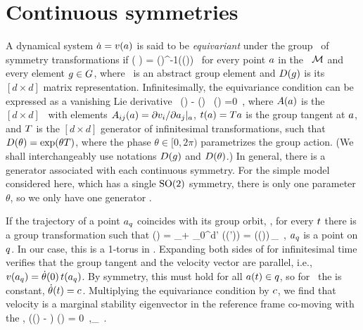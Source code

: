 \section{Continuous symmetries}
\label{s:symm}

A dynamical system $\dot{a}={v}(a)$ is said to be
\emph{equivariant} under the group \Group\ of symmetry transformations if
\beq
	\vel( \ssp )
    =  \matrixRep(\LieEl)^{-1}\vel(\matrixRep(\LieEl)\ssp)
	\,
for every point $a$ in the \statesp\ ${\cal M}$ and every element $g \in
G$, where \LieEl\ is an abstract group element and
${D}(g)$ is its $[d\!\times\!d]$ matrix representation.
Infinitesimally, the equivariance condition  can be expressed as
a vanishing Lie derivative
\beq
  \Lg \, \vel(\ssp)  - \Mvar(\ssp) \, \groupTan(\ssp) =0
  \,,
where
${A}(a)$ is the $[d\!\times\!d]$ \stabmat\, with elements
${A}_{ij}(a)={\partial {v}_i}/{\partial a_j}|_{a}$, $ t(a)
= {T} a $ is the group tangent at $a$, and ${T}$ is the
$[d\!\times\!d]$ generator of infinitesimal transformations, such that
${D}(\theta) = \exp(\theta{T})$, where the phase $\theta \in [0,2\pi)$
parametrizes the group action. (We shall interchangeably use notations
${D}(g)$ and ${D}(\theta)$.) In general, there is a
generator associated with each continuous symmetry. For the simple model 
considered here, which has a single $\textrm{SO}(2)$ symmetry, there is only one 
parameter $\theta$, so we only have one generator \Lg.

If the trajectory of a point $a_q$ coincides with its group
orbit, \ie, for every $t$ there is a group transformation such that
\beq
\ssp (\zeit)
    = \ssp_\stagn + \int_0^\zeit \!\!d\zeit' \vel(\ssp (\zeit'))
    = \matrixRep(\theta (\zeit))\,\ssp_\stagn
  \,,
$a_q$ is a point on \emph{\reqv} $q$. In our case, this is a 
1-torus in \statesp. Expanding both sides of  for infinitesimal time
verifies that the group tangent and the velocity vector are parallel, i.e.,
 ${v}(a_q) = \dot{\theta}(0) \, t(a_q)$.
By symmetry, this must hold for all $a(t) \in q$, so for \reqva\
the \emph{\phaseVel} is constant, $\dot{\theta}(t) = c$.
Multiplying the equivariance condition \refeq{inftmInv} by $c$, we
find that velocity is a marginal stability eigenvector in the reference frame co-moving 
with the \reqv,
\beq
(\Mvar (\ssp) - \velRel \Lg) \vel (\ssp) = 0
\,,\qquad \ssp \in \pS_\stagn
\,.

